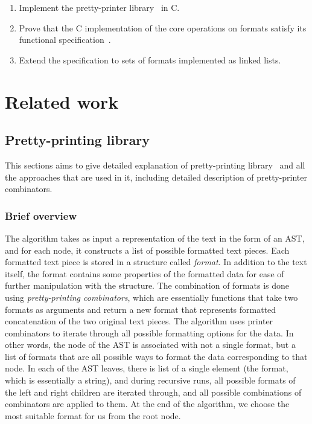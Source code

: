 \documentclass[14pt]{constructor-diploma}
\begin{document}
\begin{enumerate}
  \item Implement the pretty-printer library~\cite{swierstra} in C.
  \item Prove that the C implementation of the core operations on formats satisfy its functional specification~\cite{korolihin}.
  \item Extend the specification to sets of formats implemented as linked lists.
\end{enumerate}


\section{Related work}

\subsection{Pretty-printing library}

This sections aims to give detailed explanation of pretty-printing library~\cites{swierstra} and all the approaches 
that are used in it, including detailed description of pretty-printer combinators.

\label{section_brief}
\subsubsection{Brief overview}
The algorithm takes as input a representation of the text in the form of an AST, and for each node, 
it constructs a list of possible formatted text pieces. 
Each formatted text piece is stored in a structure called \textit{format}. 
In addition to the text itself, the format contains some properties of the formatted data for ease of further manipulation with the structure.
The combination of formats is done using \textit{pretty-printing combinators}, 
which are essentially functions that take two formats as arguments
and return a new format that represents formatted concatenation of the two original text pieces. 
The algorithm uses printer combinators to iterate through all possible formatting options for the data. 
In other words, the node of the AST is associated with not a single format, 
but a list of formats that are all possible ways to format the data corresponding to that node. 
In each of the AST leaves, there is list of a single element (the format, which is essentially a string), 
and during recursive runs, all possible formats of the left and right children are iterated through, 
and all possible combinations of combinators are applied to them. 
At the end of the algorithm, we choose the most suitable format for us from the root node.
\end{document}
